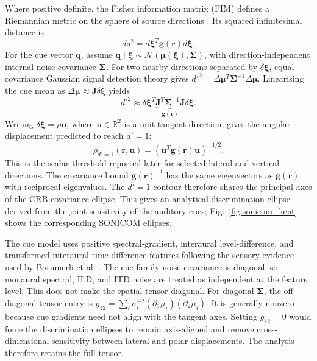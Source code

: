 \documentclass[journal]{IEEEtran}
\begin{document}
Where positive definite, the Fisher information matrix (FIM) defines a Riemannian metric on the sphere of source directions \cite{Rao1945}. Its squared infinitesimal distance is
\begin{equation}
ds^2 = d\boldsymbol{\xi}^T \mathbf{g}(\mathbf{r}) d\boldsymbol{\xi}.
\end{equation}
For the cue vector \(\mathbf q\), assume
\(\mathbf q\mid\boldsymbol{\xi}\sim
\mathcal N(\boldsymbol\mu(\boldsymbol\xi),\boldsymbol\Sigma)\),
with direction-independent internal-noise covariance \(\boldsymbol\Sigma\).
For two nearby directions separated by \(\delta\boldsymbol\xi\), equal-covariance
Gaussian signal detection theory gives
\(d'^2=\Delta\boldsymbol\mu^T\boldsymbol\Sigma^{-1}
\Delta\boldsymbol\mu\). Linearising the cue mean as
\(\Delta\boldsymbol\mu\approx\mathbf J\delta\boldsymbol\xi\) yields
\begin{equation}
d'^2 \approx \delta\boldsymbol{\xi}^T
\underbrace{\mathbf J^T\boldsymbol\Sigma^{-1}\mathbf J}_{\mathbf g(\mathbf r)}
\delta\boldsymbol{\xi}.
\end{equation}
Writing \(\delta\boldsymbol{\xi}=\rho\mathbf{u}\), where \(\mathbf{u}\in\mathbb{R}^{2}\) is a unit tangent direction, gives the angular displacement predicted to reach \(d'=1\):
\begin{equation}
\rho_{d'=1}(\mathbf{r},\mathbf{u})
=
\left(
\mathbf{u}^T \mathbf{g}(\mathbf{r}) \mathbf{u}
\right)^{-1/2}.
\end{equation}
This is the scalar threshold reported later for selected lateral and vertical directions. The covariance bound \(\mathbf g(\mathbf r)^{-1}\) has the same eigenvectors as \(\mathbf g(\mathbf r)\), with reciprocal eigenvalues. The \(d'=1\) contour therefore shares the principal axes of the CRB covariance ellipse. This gives an analytical discrimination ellipse derived from the joint sensitivity of the auditory cues; Fig.~\ref{fig:sonicom_kent} shows the corresponding SONICOM ellipses.

The cue model uses positive spectral-gradient, interaural level-difference, and transformed interaural time-difference features following the sensory evidence used by Barumerli et al. \cite{Barumerli2023}. The cue-family noise covariance is diagonal, so monaural spectral, ILD, and ITD noise are treated as independent at the feature level. This does not make the spatial tensor diagonal. For diagonal \(\boldsymbol\Sigma\), the off-diagonal tensor entry is
\(g_{12}=\sum_i \sigma_i^{-2}(\partial_1\mu_i)(\partial_2\mu_i)\).
It is generally nonzero because cue gradients need not align with the tangent
axes. Setting \(g_{12}=0\) would force the discrimination ellipses to remain
axis-aligned and remove cross-dimensional sensitivity between lateral and polar
displacements. The analysis therefore retains the full tensor.
\end{document}
